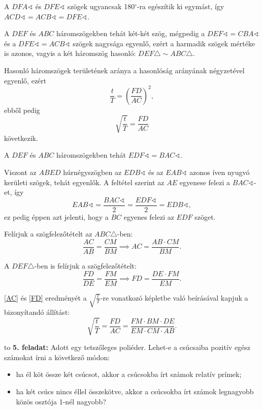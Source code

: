 \documentclass[a4paper,10pt]{article}
\newcommand{\vonal}{\hbox to \hsize{\hskip2truecm\hrulefill\hskip2truecm}}
\newcommand{\degre}{\ensuremath{^\circ}}
\begin{document}
A $DFA\sphericalangle$ és $DFE\sphericalangle$ szögek ugyancsak 180\degre-ra egészítik ki egymást, így $ACD\sphericalangle = ACB\sphericalangle = DFE\sphericalangle$.

A $DEF$ és $ABC$ háromszögekben tehát két-két szög, mégpedig a $DEF\sphericalangle = CBA\sphericalangle$ és a $DFE\sphericalangle = ACB\sphericalangle$ szögek nagysága egyenlő, ezért a harmadik szögek mértéke is azonos, vagyis a két háromszög hasonló: $DEF\triangle\sim ABC\triangle$.

Hasonló háromszögek területének aránya a hasonlóság arányának négyzetével egyenlő, ezért
\[\frac t T = \left(\frac{FD}{AC}\right)^2,\]
ebből pedig
\[\sqrt{\frac t T}=\frac{FD}{AC}\]
következik.

A $DEF$ és $ABC$ háromszögekben tehát $EDF\sphericalangle = BAC\sphericalangle$.

Viszont az $ABED$ húrnégyszögben az $EDB\sphericalangle$ és az $EAB\sphericalangle$ azonos íven nyugvó kerületi szögek, tehát egyenlők. A feltétel szerint az $AE$ egyenese felezi a $BAC\sphericalangle$-et, így 
\[EAB\sphericalangle=\frac{BAC\sphericalangle}{2}=\frac{EDF\sphericalangle}{2}=EDB\sphericalangle,\]
ez pedig éppen azt jelenti, hogy a $BC$ egyenes felezi az $EDF$ szöget.

Felírjuk a szögfelezőtételt az $ABC\triangle$-ben:
\begin{equation}\label{AC}
\frac{AC}{AB}=\frac{CM}{BM}\implies AC=\frac{AB\cdot CM}{BM}.
\end{equation}

A $DEF\triangle$-ben is felírjuk a szögfelezőtételt:
\begin{equation}\label{FD}
\frac{FD}{DE}=\frac{FM}{EM}\implies FD=\frac{DE\cdot FM}{EM}.
\end{equation}

\eqref{AC} és \eqref{FD} eredményét a $\sqrt{\frac{t}{T}}$-re vonatkozó képletbe való beírásával kapjuk a bizonyítandó állítást:
\[\sqrt{\frac t T}=\frac{FD}{AC}=\frac{FM \cdot BM \cdot DE}{EM \cdot CM \cdot AB}.\]

\medskip

\vonal
{\bf 5. feladat: } 
Adott egy tetszőleges poliéder. Lehet-e a csúcsaiba pozitív egész számokat írni a következő módon:
\begin{itemize}
\item[] 
ha él köt össze két csúcsot, akkor a csúcsokba írt számok relatív prímek;
\item[] 
ha két csúcs nincs éllel összekötve, akkor a csúcsokba írt számok legnagyobb közös osztója 1-nél nagyobb?
\end{itemize}
\end{document}
